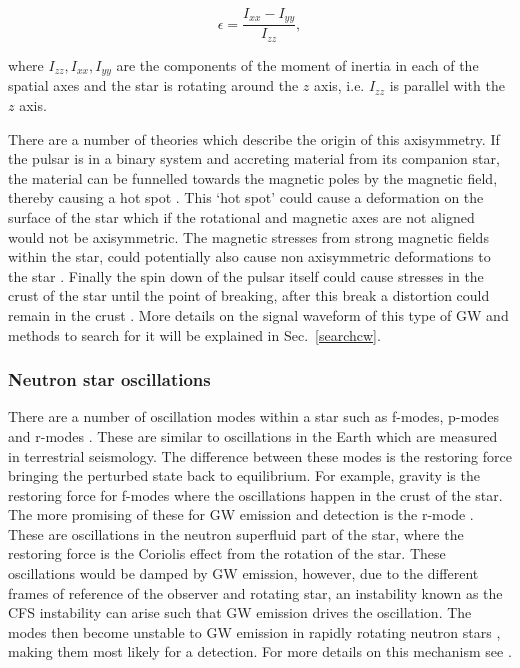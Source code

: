 \begin{equation}
\label{intro:source:cw:ellipticity}
\epsilon = \frac{I_{xx}-I_{yy}}{I_{zz}},
\end{equation}

where $I_{zz},I_{xx},I_{yy}$ are the components of the moment of inertia in each of the spatial axes and the star is rotating around the $z$ axis, i.e. $I_{zz}$ is parallel with the $z$ axis.

There are a number of theories which describe the origin of this axisymmetry.
If the pulsar is in a binary system and accreting material from its companion
star, the material can be funnelled towards the magnetic poles by the magnetic
field, thereby causing a hot spot \citep{haskell2015DetectingGravitational}.
This `hot spot' could cause a deformation on the surface of the star which if the rotational and magnetic axes are not aligned would not be axisymmetric.  
The magnetic stresses from strong magnetic fields within the
star, could potentially also cause non axisymmetric deformations to the star
\citep{cutler2002GravitationalWaves}. Finally
the spin down of the pulsar itself could cause stresses in the crust of the
star until the point of breaking, after this break a
distortion could remain in the crust \citep{becker2009NeutronStars,ruderman1976CrustbreakingNeutron}.  
More details on the signal waveform of this type of \gls{GW} and methods to search for it will be explained in Sec.~\ref{searchcw}.
 
\subsubsection{Neutron star oscillations}
There are a number of oscillation modes within a star such as f-modes, p-modes
and r-modes \citep{becker2009NeutronStars}.  These are similar to oscillations
in the Earth which are measured in terrestrial seismology.  The difference
between these modes is the restoring force bringing the perturbed state back to
equilibrium.  For example, gravity is the restoring force for f-modes where the
oscillations happen in the crust of the star.  The more promising of these for
\gls{GW} emission and detection is the r-mode
\citep{owen2000GravitationalWaves}.
These are oscillations in the neutron superfluid part of the star, where the
restoring force is the Coriolis effect from the rotation of the star.  
These oscillations would be damped by \gls{GW} emission, however, due to the different frames of reference of the observer and rotating star, an instability known as the \gls{CFS} instability \citep{chandrasekhar1970SolutionsTwo} can arise such that \gls{GW} emission drives the oscillation. 
The modes then become unstable to \gls{GW} emission in rapidly rotating neutron
stars \citep{owen2000GravitationalWaves}, making them most likely for a
detection.  For more details on this mechanism see
\citep{owen2000GravitationalWaves,lasky2015GravitationalWaves,owen1998GravitationalWaves,jonesCFSInstability}.

